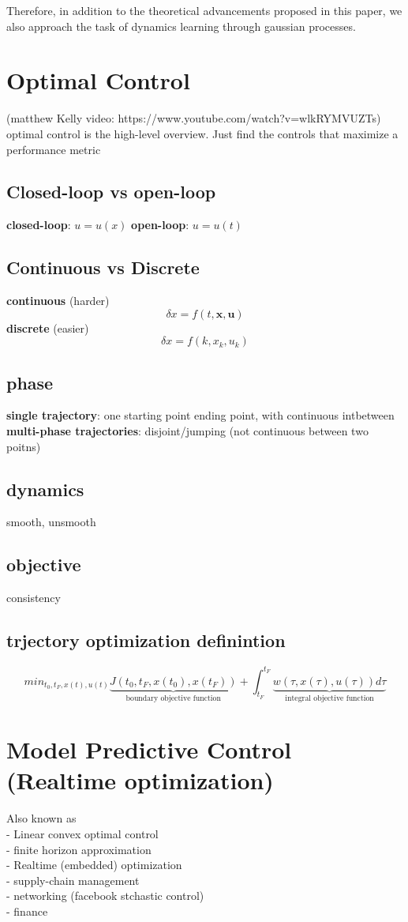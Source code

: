 \documentclass[11pt]{article}
\begin{document}
Therefore, in addition to the theoretical advancements proposed in this paper, we
also approach the task of dynamics learning through gaussian processes.

\section{Optimal Control} (matthew Kelly video: https://www.youtube.com/watch?v=wlkRYMVUZTs)
optimal control is the high-level overview. Just find the controls that maximize
a performance metric
\subsection{Closed-loop vs open-loop}
\textbf{closed-loop}: $u=u(x)$
\textbf{open-loop}: $u=u(t)$

\subsection{Continuous vs Discrete}
\textbf{continuous} (harder) \[ \delta x = f(t,\mathbf{x}, \mathbf{u})\]
\textbf{discrete} (easier) \[\delta x = f(k, x_k, u_k)\]

\subsection{phase}
\textbf{single trajectory}: one starting point ending point, with continuous intbetween
\textbf{multi-phase trajectories}: disjoint/jumping (not continuous between two poitns)

\subsection{dynamics}
smooth, unsmooth

\subsection{objective}
consistency

\subsection{trjectory optimization definintion}
\[min_{t_0, t_F, x(t), u(t)} \underbrace{J(t_0, t_F, x(t_0), x(t_F))}_{\text{boundary objective function}}
    + \int_{t_F}^{t_F}\underbrace{w(\tau, x(\tau), u(\tau)) d\tau}_{\text{integral objective function}}\]

\section{Model Predictive Control (Realtime optimization)}
Also known as \\
- Linear convex optimal control\\
- finite horizon approximation\\
- Realtime (embedded) optimization\\
- supply-chain management\\
- networking (facebook stchastic control)\\
- finance
\end{document}
